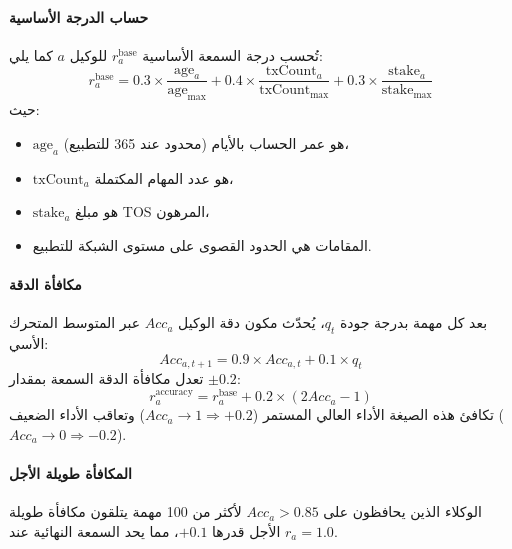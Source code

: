 \documentclass[11pt]{article}
\begin{document}
\paragraph{حساب الدرجة الأساسية} تُحسب درجة السمعة الأساسية $r_a^{\text{base}}$ للوكيل $a$ كما يلي:
\begin{equation}
r_a^{\text{base}} = 0.3 \times \frac{\text{age}_a}{\text{age}_{\max}} + 0.4 \times \frac{\text{txCount}_a}{\text{txCount}_{\max}} + 0.3 \times \frac{\text{stake}_a}{\text{stake}_{\max}}
\end{equation}
حيث:
\begin{itemize}[noitemsep]
  \item $\text{age}_a$ هو عمر الحساب بالأيام (محدود عند 365 للتطبيع)،
  \item $\text{txCount}_a$ هو عدد المهام المكتملة،
  \item $\text{stake}_a$ هو مبلغ TOS المرهون،
  \item المقامات هي الحدود القصوى على مستوى الشبكة للتطبيع.
\end{itemize}

\paragraph{مكافأة الدقة} بعد كل مهمة بدرجة جودة $q_t$، يُحدّث مكون دقة الوكيل $Acc_a$ عبر المتوسط المتحرك الأسي:
\begin{equation}
Acc_{a,t+1} = 0.9 \times Acc_{a,t} + 0.1 \times q_t
\end{equation}
تعدل مكافأة الدقة السمعة بمقدار $\pm 0.2$:
\begin{equation}
r_a^{\text{accuracy}} = r_a^{\text{base}} + 0.2 \times (2 Acc_a - 1)
\end{equation}
تكافئ هذه الصيغة الأداء العالي المستمر ($Acc_a \to 1 \Rightarrow +0.2$) وتعاقب الأداء الضعيف ($Acc_a \to 0 \Rightarrow -0.2$).

\paragraph{المكافأة طويلة الأجل} الوكلاء الذين يحافظون على $Acc_a > 0.85$ لأكثر من 100 مهمة يتلقون مكافأة طويلة الأجل قدرها $+0.1$، مما يحد السمعة النهائية عند $r_a = 1.0$.
\end{document}

